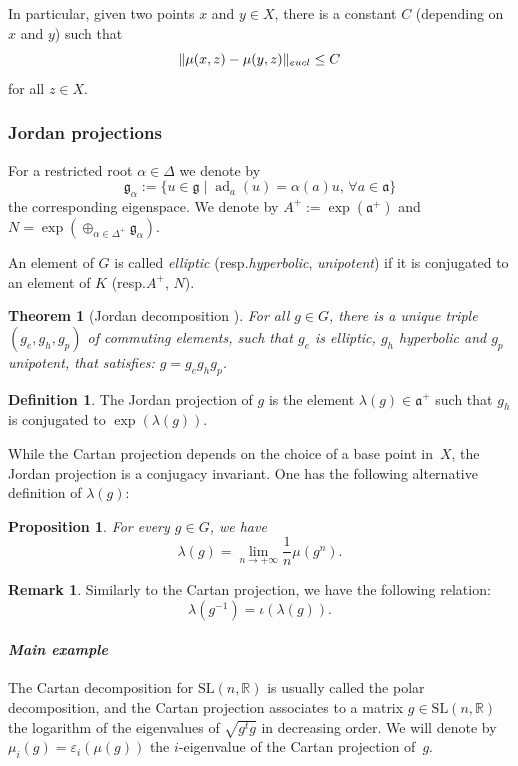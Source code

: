 \documentclass[11pt]{article}
\newcommand{\resp}{resp.\xspace}
\numberwithin{equation}{section}
\newtheorem{theorem}[theo]{Theorem}
\newtheorem{prop}[theo]{Proposition}
\theoremstyle{definition}
\newtheorem{defi}[theo]{Definition}
\newtheorem{rmk}[theo]{Remark}
\newcommand{\R}{\mathbb{R}}
\newcommand{\SL}{\mathrm{SL}}
\newcommand{\fa}{\mathfrak{a}}
\newcommand{\norm}[1]{\Vert #1 \Vert}
\DeclareMathOperator{\ad}{ad}
\let\epsilon\varepsilon
\let\op\iota
\begin{document}
In particular, given two points $x$ and $y\in X$, there is a constant $C$ (depending on $x$ and $y$) such that
\[\norm{\mu(x,z) - \mu(y,z)}_{\textup{eucl}} \leq C\]
for all $z\in X$.

\subsubsection{Jordan projections}
For a restricted root $\alpha\in \Delta$ we denote by
\[
\mathfrak{g}_\alpha := \{ u \in \mathfrak{g}\mid \ad_a(u) = \alpha(a) u , \, \forall a \in \fa \}
\]
the corresponding eigenspace. We denote by $A^+ := \exp(\fa^+)$ and $N=\exp(\oplus_{\alpha \in \Delta^+} \mathfrak{g}_\alpha) $.

An element of $G$ is called \emph{elliptic} (\resp \emph{hyperbolic}, \emph{unipotent}) if it is conjugated to an element of $K$ (\resp $A^+$, $N$).

\begin{theorem}[Jordan decomposition {\cite[Th.\,2.19.24]{helgason1978differential}}]
For all $g\in G$, there is a unique triple $(g_e, g_h, g_p)$ of commuting elements, such that $g_e$ is elliptic, $g_h$ hyperbolic and $g_p$ unipotent, that satisfies: $g=g_eg_hg_p$.
\end{theorem}

\begin{defi}
The Jordan projection of $g$ is the element $\lambda(g)\in \fa^+$ such that $g_h$ is conjugated to $\exp(\lambda(g))$.
\end{defi}
While the Cartan projection depends on the choice of a base point in~$X$, the Jordan projection is a conjugacy invariant. One has the following alternative definition of $\lambda(g)$:

\begin{prop}
For every $g\in G$, we have
\[\lambda(g) = \lim_{n\to +\infty} \frac{1}{n}\mu(g^n).\]
\end{prop}

\begin{rmk}
Similarly to the Cartan projection, we have the following relation:
\[\lambda(g^{-1}) = \op(\lambda(g)).\]
\end{rmk}

\paragraph{\textit{Main example}}

The Cartan decomposition for $\SL(n,\R)$ is usually called the polar decomposition, and the Cartan projection associates to a matrix $g\in \SL(n,\R)$ the logarithm of the eigenvalues of $\sqrt{g^t g}$ in decreasing order. We will denote by $\mu_i(g) = \epsilon_i(\mu(g))$ the $i$-eigenvalue of the Cartan projection of~$g$.
\end{document}
